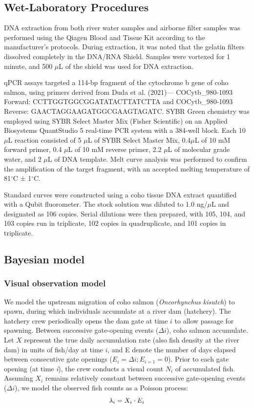 \documentclass{article}
\begin{document}
\subsection{Wet-Laboratory Procedures}
DNA extraction from both river water samples and airborne filter samples was performed using the Qiagen Blood and Tissue Kit according to the manufacturer’s protocols. During extraction, it was noted that the gelatin filters dissolved completely in the DNA/RNA Shield. Samples were vortexed for 1 minute, and 500 $\mu$L of the shield was used for DNA extraction.

qPCR assays targeted a 114-bp fragment of the cytochrome b gene of coho salmon, using primers derived from Duda et al. (2021)— COCytb\_980-1093 Forward: CCTTGGTGGCGGATATACTTATCTTA and COCytb\_980-1093 Reverse: GAACTAGGAAGATGGCGAAGTAGATC. SYBR Green chemistry was employed using SYBR Select Master Mix (Fisher Scientific) on an Applied Biosystems QuantStudio 5 real-time PCR system with a 384-well block. Each 10 $\mu$L reaction consisted of 5 $\mu$L of SYBR Select Master Mix, 0.4$\mu$L of 10 mM forward primer, 0.4 $\mu$L of 10 mM reverse primer, 2.2 $\mu$L of molecular grade water, and 2 $\mu$L of DNA template. Melt curve analysis was performed to confirm the amplification of the target fragment, with an accepted melting temperature of 81$^\circ$C ± 1$^\circ$C.

Standard curves were constructed using a coho tissue DNA extract quantified with a Qubit fluorometer. The stock solution was diluted to 1.0 ng/$\mu$L and designated as 106 copies. Serial dilutions were then prepared, with 105, 104, and 103 copies run in triplicate, 102 copies in quadruplicate, and 101 copies in triplicate.


\subsection{Bayesian model}
\subsubsection{Visual observation model}
We model the upstream migration of coho salmon (\textit{Oncorhynchus kisutch}) to spawn, during which individuals accumulate at a river dam (hatchery). The hatchery crew periodically opens the dam gate at time $i$ to allow passage for spawning. Between successive gate-opening events ($\Delta i$), coho salmon accumulate. Let $X$ represent the true daily accumulation rate (also fish density at the river dam) in units of fish/day at time $i$, and E denote the number of days elapsed between consecutive gate openings ($ E_i =\Delta i; E_{i=1} = 0$). Prior to each gate opening (at time \textit{i}), the crew conducts a visual count $N_i$ of accumulated fish.
Assuming $X_i$ remains relatively constant between successive gate-opening events ($\Delta i$), we model the observed fish counts as a Poisson process:
\begin{equation}
\lambda_i = X_i \cdot E_i \\
\end{equation}
\end{document}

